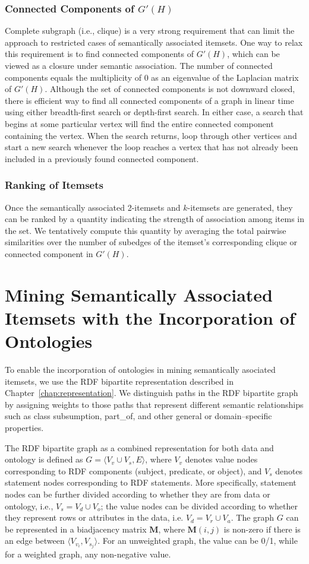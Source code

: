 \subsubsection{Connected Components of $G'(H)$}
Complete subgraph (i.e., clique) is a very strong requirement that can limit the approach to restricted cases of semantically associated itemsets. One way to relax this requirement is to find connected components of $G'(H)$, which can be viewed as a closure under semantic association. The number of connected components equals the multiplicity of 0 as an eigenvalue of the Laplacian matrix of $G'(H)$. Although the set of connected components is not downward closed, there is efficient way to find all connected components of a graph in linear time using either breadth-first search or depth-first search. In either case, a search that begins at some particular vertex will find the entire connected component containing the vertex. When the search returns, loop through other vertices and start a new search whenever the loop reaches a vertex that has not already been included in a previously found connected component.

\subsubsection{Ranking of Itemsets}
Once the semantically associated 2-itemsets and $k$-itemsets are generated, they can be ranked by a quantity indicating the strength of association among items in the set. We tentatively compute this quantity by averaging the total pairwise similarities over the number of subedges of the itemset's corresponding clique or connected component in $G'(H)$.

\section{Mining Semantically Associated Itemsets with the Incorporation of Ontologies}

To enable the incorporation of ontologies in mining semantically asociated itemsets, we use the RDF bipartite representation described in Chapter~\ref{chap:representation}. We distinguish paths in the RDF bipartite graph by assigning weights to those paths that represent different semantic relationships such as class subsumption, part\_of, and other general or domain--specific properties.

The RDF bipartite graph as a combined representation for both data and ontology is defined as $G=\langle V_v \cup V_s, E \rangle$, where $V_v$ denotes value nodes corresponding to RDF components (subject, predicate, or object), and $V_s$ denotes statement nodes corresponding to RDF statements. More specifically, statement nodes can be further divided according to whether they are from data or ontology, i.e., $V_s=V_d \cup V_o$; the value nodes can be divided according to whether they represent rows or attributes in the data, i.e. $V_d=V_r \cup V_a$. The graph $G$ can be represented in a biadjacency matrix $\mathbf{M}$, where $\mathbf{M}(i,j)$ is non-zero if there is an edge between $\langle V_{v_i}, V_{s_j} \rangle$. For an unweighted graph, the value can be 0/1, while for a weighted graph, any non-negative value.

